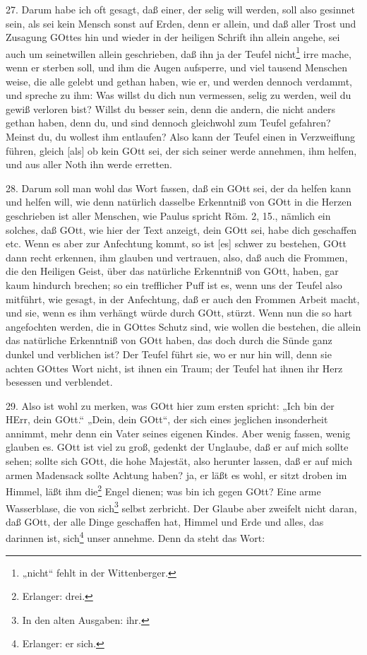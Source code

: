 27. Darum habe ich oft gesagt, daß einer, der selig will werden, soll also gesinnet sein, als sei kein Mensch sonst auf Erden, denn er allein, und daß aller Trost und Zusagung GOttes hin und wieder in der heiligen Schrift ihn allein angehe, sei auch um seinetwillen allein geschrieben, daß ihn ja der Teufel nicht\footnote{„nicht“ fehlt in der Wittenberger.} irre mache, wenn er sterben soll, und ihm die Augen aufsperre, und viel tausend Menschen weise, die alle gelebt und gethan haben, wie er, und werden dennoch verdammt, und spreche zu ihm: Was willst du dich nun vermessen, selig zu werden, weil du gewiß verloren bist? Willst du besser sein, denn die andern, die nicht anders gethan haben, denn du, und sind dennoch gleichwohl zum Teufel gefahren? Meinst du, du wollest ihm entlaufen? Also kann der Teufel einen in Verzweiflung führen, gleich [als] ob kein GOtt sei, der sich seiner werde annehmen, ihm helfen, und aus aller Noth ihn werde erretten.

28. Darum soll man wohl das Wort fassen, daß ein GOtt sei, der da helfen kann und helfen will, wie denn natürlich dasselbe Erkenntniß von GOtt in die Herzen geschrieben ist aller Menschen, wie Paulus spricht Röm. 2, 15., nämlich ein solches, daß GOtt, wie hier der Text anzeigt, dein GOtt sei, habe dich geschaffen etc. Wenn es aber zur Anfechtung kommt, so ist [es] schwer zu bestehen, GOtt dann recht erkennen, ihm glauben und vertrauen, also, daß auch die Frommen, die den Heiligen Geist, über das natürliche Erkenntniß von GOtt, haben, gar kaum hindurch brechen; so ein trefflicher Puff ist es, wenn uns der Teufel also mitführt, wie gesagt, in der Anfechtung, daß er auch den Frommen Arbeit macht, und sie, wenn es ihm verhängt würde durch GOtt, stürzt. Wenn nun die so hart angefochten werden, die in GOttes Schutz sind, wie wollen die bestehen, die allein das natürliche Erkenntniß von GOtt haben, das doch durch die Sünde ganz dunkel und verblichen ist? Der Teufel führt sie, wo er nur hin will, denn sie achten GOttes Wort nicht, ist ihnen ein Traum; der Teufel hat ihnen ihr Herz besessen und verblendet.

29. Also ist wohl zu merken, was GOtt hier zum ersten spricht: „Ich bin der HErr, dein GOtt.“ „Dein, dein GOtt“, der sich eines jeglichen insonderheit annimmt, mehr denn ein Vater seines eigenen Kindes. Aber wenig fassen, wenig glauben es. GOtt ist viel zu groß, gedenkt der Unglaube, daß er auf mich sollte sehen; sollte sich GOtt, die hohe Majestät, also herunter lassen, daß er auf mich armen Madensack sollte Achtung haben? ja, er läßt es wohl, er sitzt droben im Himmel, läßt ihm die\footnote{Erlanger: drei.} Engel dienen; was bin ich gegen GOtt? Eine arme Wasserblase, die von sich\footnote{In den alten Ausgaben: ihr.} selbst zerbricht. Der Glaube aber zweifelt nicht daran, daß GOtt, der alle Dinge geschaffen hat, Himmel und Erde und alles, das darinnen ist, sich\footnote{Erlanger: er sich.} unser annehme. Denn da steht das Wort:

